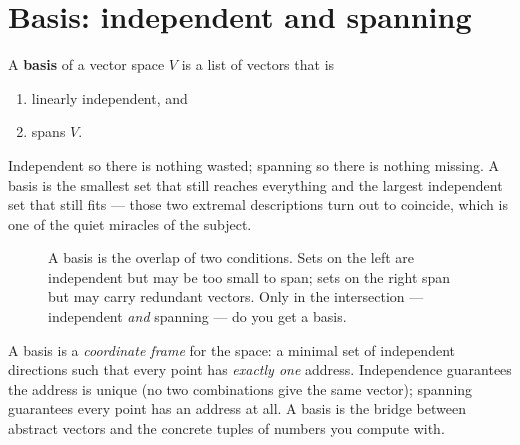\section{Basis: independent and spanning}
\label{ch14:basis}

\begin{definition}[Basis]
\label{ch14:def-basis}
A \textbf{basis} of a vector space $V$ is a list of vectors that is
\begin{enumerate}[label=(\roman*)]
  \item linearly independent, and
  \item spans $V$.
\end{enumerate}
\end{definition}

Independent so there is nothing wasted; spanning so there is nothing missing. A
basis is the smallest set that still reaches everything and the largest
independent set that still fits --- those two extremal descriptions turn out to
coincide, which is one of the quiet miracles of the subject.

\begin{figure}[H]
\centering
{}
\caption{A basis is the overlap of two conditions. Sets on the left are
independent but may be too small to span; sets on the right span but may carry
redundant vectors. Only in the intersection --- independent \emph{and} spanning ---
do you get a basis.}
\label{ch14:fig-venn}
\end{figure}

\begin{intuitionbox}
A basis is a \emph{coordinate frame} for the space: a minimal set of independent
directions such that every point has \emph{exactly one} address. Independence
guarantees the address is unique (no two combinations give the same vector);
spanning guarantees every point has an address at all. A basis is the bridge
between abstract vectors and the concrete tuples of numbers you compute with.
\end{intuitionbox}

